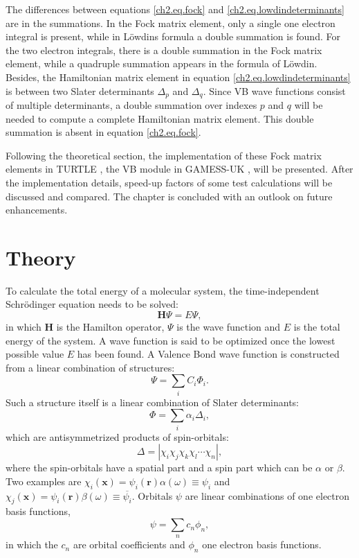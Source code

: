 The differences between equations \ref{ch2.eq.fock} and \ref{ch2.eq.lowdindeterminants} are in the summations. In the Fock matrix element, only a single one electron integral is present, while in L\"{o}wdins formula a double summation is found. For the two electron integrals, there is a double summation in the Fock matrix element, while  a quadruple summation appears in the formula of L\"{o}wdin. Besides, the Hamiltonian matrix element in equation \ref{ch2.eq.lowdindeterminants} is between two Slater determinants $\Delta_p$ and $\Delta_q$. Since VB wave functions consist of multiple determinants, a double summation over indexes $p$ and $q$ will be needed to compute a complete Hamiltonian matrix element. This double summation is absent in equation \ref{ch2.eq.fock}. 

Following the theoretical section, the implementation of these Fock matrix elements in TURTLE \cite{turtle}, the VB module in GAMESS-UK \cite{gamess}, will be presented. After the implementation details, speed-up factors of some test calculations will be discussed and compared. The chapter is concluded with an outlook on future enhancements.  

\section{Theory}

To calculate the total energy of a molecular system, the time-independent Schr\"{o}dinger equation needs to be solved:
\begin{equation}
\mathbf{H}\Psi = E\Psi,
\end{equation}
in which $\mathbf{H}$ is the Hamilton operator, $\Psi$ is the wave function and $E$ is the total energy of the system. A wave function is said to be optimized once the lowest possible value $E$ has been found. A Valence Bond wave function is constructed from a linear combination of structures:
\begin{equation}
\Psi = \sum_{i} C_i \Phi_i.
\label{ch2.eq.vbwf}
\end{equation}
Such a structure itself is a linear combination of Slater determinants:
\begin{equation}
\Phi = \sum_{i} \alpha_i \Delta_i,
\label{ch2.eq.struct}
\end{equation}
which are antisymmetrized products of spin-orbitals:
\begin{equation}
\Delta = |\chi_i\chi_j\chi_k\chi_l \cdots \chi_n|,
\label{ch2.eq.determ}
\end{equation}
where the spin-orbitals have a spatial part and a spin part which can be $\alpha$ or $\beta$. Two examples are  $\chi_i(\mathbf{x})=\psi_i(\mathbf{r})\alpha(\omega)\equiv\psi_i$ and $\chi_j(\mathbf{x})=\psi_i(\mathbf{r})\beta(\omega)\equiv\overline{\psi_i}$.
Orbitals $\psi$ are linear combinations of one electron basis functions,
\begin{equation}
\psi = \sum_{n} c_n \phi_n,
\label{ch2.eq.basis}
\end{equation}
in which the $c_n$ are orbital coefficients and $\phi_n$ one electron basis functions.

